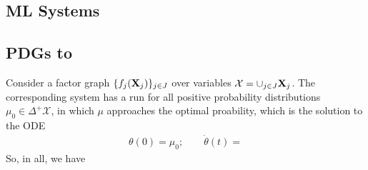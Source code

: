 \documentclass{article}
\begin{document}
\subsection{ML Systems}
\subsection{PDGs to }

    
\begin{example}
    Consider a factor graph 
    $\{ f_j(\mathbf{X}_j) \}_{j \in J}$ over variables $\mathcal X = \cup_{j \in J} \mathbf{X}_j$. 
    The corresponding system has a run for all positive probability distributions $\mu_0 \in \Delta^{\!\!{+}\!} \mathcal X$, in which $\mu$ approaches the optimal proability, which is the solution to the ODE
    \begin{align*}
        \theta(0) = \mu_0;
            \qquad
        \dot\theta(t) = 
    \end{align*}
    So, in all, we have
\end{example}

    
\end{document}
